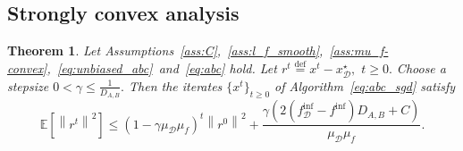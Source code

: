 \documentclass{article}
\newcommand{\bb}{\mathbb}
\newcommand{\cD}{\mathcal{D}}
\newcommand{\eqdef}{\stackrel{\text{def}}{=}}
\newcommand{\Exp}[1]{{\bb E}\left[#1\right]}
\newtheorem{theorem}{Theorem}
\theoremstyle{plain}
\newcommand{\tf}{f_{\mathcal{D}}}
\theoremstyle{plain}
\theoremstyle{definition}
\theoremstyle{remark}
\begin{document}
\subsection{Strongly convex analysis}
\begin{theorem} \label{eq:ABC_strcvx_res}
Let Assumptions~\ref{ass:C},~\ref{ass:l_f_smooth},~\ref{ass:mu_f-convex},~\ref{eq:unbiased_abc}~and~\ref{eq:abc} hold. Let $r^t\eqdef x^t - x_\cD^\star,$ $t\geq 0.$ Choose a stepsize $0<\gamma \leq \frac{1}{D_{A,B}}.$ Then the iterates $\{x^t\}_{t\geq 0}$ of Algorithm~\ref{eq:abc_sgd} satisfy
	\begin{equation}\label{eq:main_stroncvx_abc}
		\Exp{\left\|r^{t}\right\|^2} \leq \left(1-\gamma\mu_{\mathcal{D}}\mu_f\right)^t\left\|r^0\right\|^2 + \frac{\gamma\left(2\left(\tf^{\inf} - f^{\inf}\right)D_{A,B}+C\right)}{\mu_{\mathcal{D}}\mu_f}.
	\end{equation}
\end{theorem}
\end{document}
